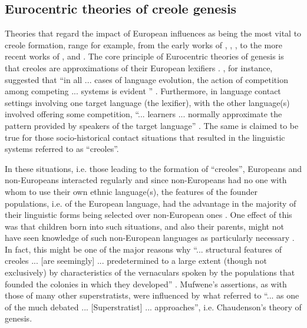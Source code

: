 \subsection {Eurocentric theories of creole genesis} \label{2.2.1}
Theories that regard the impact of European influences as being the most vital to creole formation, range for example, from the early works of \citet{Bloomfield33}, \citet{Hall66}, \citet{Ferguson71}, to the more recent works of \citet{Chaudenson92}, and \citet{Mufwene01, Mufwene08, Mufwene08b}. The core principle of Eurocentric theories of genesis is that creoles are approximations of their European lexifiers \citep[43]{Baker00}.  \citet{Mufwene08}, for instance, suggested that ``in all ... cases of language evolution, the action of competition among competing ... systems is evident '' \citep[58]{Mufwene08}. Furthermore, in language contact settings involving one target language (the lexifier), with the other language(s) involved offering some competition, ``... learners ... normally approximate the pattern provided by speakers of the target language'' \citep[122]{Mufwene08}. The same is claimed to be true for those socio-historical contact situations that resulted in the linguistic systems referred to as ``creoles''.

In these situations, i.e. those leading to the formation of ``creoles'', Europeans and non-Europeans interacted regularly and since non-Europeans had no one with whom to use their own ethnic language(s), the features of the founder populations, i.e. of the European language, had the advantage in the majority of their linguistic forms being selected over non-European ones \citep{Mufwene96}. One effect of this was that children born into such situations, and also their parents, might not have seen knowledge of such non-European languages as particularly necessary \citep{Mufwene08b}. In fact, this might be one of the major reasons why ``... structural features of creoles ... [are seemingly] ... predetermined to a large extent (though not exclusively) by characteristics of the vernaculars spoken by the populations that founded the colonies in which they developed'' \citep[28]{Mufwene96}. Mufwene's assertions, as with those of many other superstratists, were influenced by what \citep[3]{Braun09} referred to ``... as one of the much debated ... [Superstratist] ... approaches'', i.e. Chaudenson's \citep{Chaudenson92} theory of genesis.

